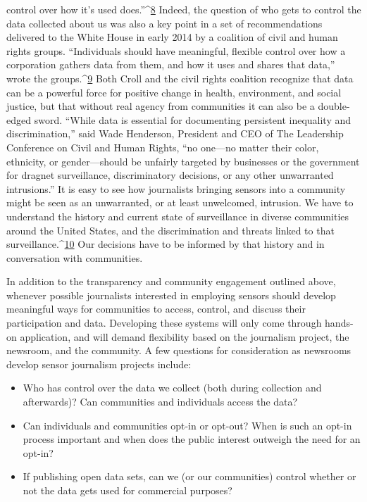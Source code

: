 control over how it's used does.''^{\href{#endnotes-stearns}{8}} Indeed, the question of who gets to control
the data collected about us was also a key point in a set of recommendations
delivered to the White House in early 2014 by a coalition of civil and human
rights groups. ``Individuals should have meaningful, flexible control over
how a corporation gathers data from them, and how it uses and shares that
data,'' wrote the groups.^{\href{#endnotes-stearns}{9}}
Both Croll and the civil rights coalition recognize that data can be a powerful
force for positive change in health, environment, and social justice, but
that without real agency from communities it can also be a double-edged
sword. ``While data is essential for documenting persistent inequality and
discrimination,'' said Wade Henderson, President and CEO of The Leadership
Conference on Civil and Human Rights, ``no one—no matter their
color, ethnicity, or gender—should be unfairly targeted by businesses or the
government for dragnet surveillance, discriminatory decisions, or any other
unwarranted intrusions.''
It is easy to see how journalists bringing sensors into a community might
be seen as an unwarranted, or at least unwelcomed, intrusion. We have to
understand the history and current state of surveillance in diverse communities
around the United States, and the discrimination and threats linked
to that surveillance.^{\href{#endnotes-stearns}{10}} Our decisions have to be informed by that history and
in conversation with communities.

In addition to the transparency and community engagement outlined
above, whenever possible journalists interested in employing sensors
should develop meaningful ways for communities to access, control, and
discuss their participation and data. Developing these systems will only
come through hands-on application, and will demand flexibility based
on the journalism project, the newsroom, and the community. A few
questions for consideration as newsrooms develop sensor journalism
projects include:
\begin{itemize}
\item Who has control over the data we collect (both during
collection and afterwards)? Can communities and individuals
access the data?
\item Can individuals and communities opt-in or opt-out? When is
such an opt-in process important and when does the public
interest outweigh the need for an opt-in?
\item If publishing open data sets, can we (or our communities) control
whether or not the data gets used for commercial purposes?
\end{itemize}

